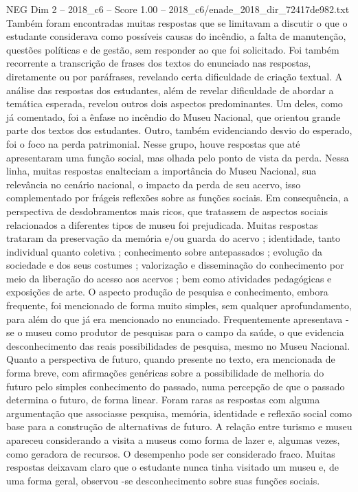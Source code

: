 \begin{textsample}{NEG Dim 2 – 2018\_c6 – Score 1.00 – 2018\_c6/enade\_2018\_dir\_72417de982.txt}
Também foram encontradas muitas respostas que se limitavam a discutir o que o estudante considerava como possíveis causas do incêndio, a falta de manutenção, questões políticas e de gestão, sem responder ao que foi solicitado.
Foi também recorrente a transcrição de frases dos textos do enunciado nas respostas, diretamente ou por paráfrases, revelando certa dificuldade de criação textual.
A análise das respostas dos estudantes, além de revelar dificuldade de abordar a temática esperada, revelou outros dois aspectos predominantes.
Um deles, como já comentado, foi a ênfase no incêndio do Museu Nacional, que orientou grande parte dos textos dos estudantes.
Outro, também evidenciando desvio do esperado, foi o foco na perda patrimonial.
Nesse grupo, houve respostas que até apresentaram uma função social, mas olhada pelo ponto de vista da perda.
Nessa linha, muitas respostas enalteciam a importância do Museu Nacional, sua relevância no cenário nacional, o impacto da perda de seu acervo, isso complementado por frágeis reflexões sobre as funções sociais.
Em consequência, a perspectiva de desdobramentos mais ricos, que tratassem de aspectos sociais relacionados a diferentes tipos de museu foi prejudicada.
Muitas respostas trataram da preservação da memória e/ou guarda do acervo ; identidade, tanto individual quanto coletiva ; conhecimento sobre antepassados ; evolução da sociedade e dos seus costumes ; valorização e disseminação do conhecimento por meio da liberação do acesso aos acervos ; bem como atividades pedagógicas e exposições de arte.
O aspecto produção de pesquisa e conhecimento, embora frequente, foi mencionado de forma muito simples, sem qualquer aprofundamento, para além do que já era mencionado no enunciado.
Frequentemente apresentava -se o museu como produtor de pesquisas para o campo da saúde, o que evidencia desconhecimento das reais possibilidades de pesquisa, mesmo no Museu Nacional.
Quanto a perspectiva de futuro, quando presente no texto, era mencionada de forma breve, com afirmações genéricas sobre a possibilidade de melhoria do futuro pelo simples conhecimento do passado, numa percepção de que o passado determina o futuro, de forma linear.
Foram raras as respostas com alguma argumentação que associasse pesquisa, memória, identidade e reflexão social como base para a construção de alternativas de futuro.
A relação entre turismo e museu apareceu considerando a visita a museus como forma de lazer e, algumas vezes, como geradora de recursos.
O desempenho pode ser considerado fraco.
Muitas respostas deixavam claro que o estudante nunca tinha visitado um museu e, de uma forma geral, observou -se desconhecimento sobre suas funções sociais.

\end{textsample}
